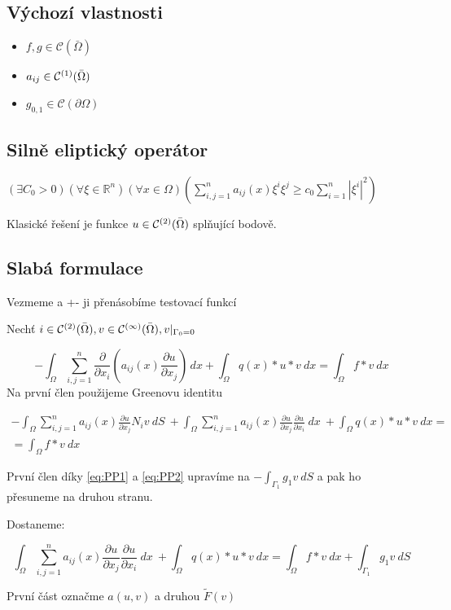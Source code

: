 \documentclass[../main.tex]{subfiles}
\begin{document}
\subsection{Výchozí vlastnosti}
\begin{itemize}
    \item $f, g \in \mathcal{C}(\bar{\Omega})$
    \item $a_{ij} \in \continuous[\bar{\Omega}]{1}$
    \item $g_{0,1} \in \mathcal{C}(\partial\Omega)$
\end{itemize}


\subsection{Silně eliptický operátor}
$(\exists C_0 > 0)(\forall \xi \in \mathbb{R}^n) (\forall x \in \Omega) (\sum_{i,j =1}^{n} a_{ij}(x)\xi^i \xi^j \geq c_0 \sum_{i = 1}^{n}|\xi^i|^2)$


Klasické řešení  je funkce $u\in\continuous[\bar{\Omega}]{2}$ splňující  bodově. 

\subsection{Slabá formulace}\label{SlabaFormulace}
Vezmeme  a +- ji přenásobíme testovací funkcí 

Nechť $i\in \closedcontinuous{2}, v\in\closedcontinuous{\infty}, v|_{\Gamma_0 = 0}$

\begin{equation}
    - \int_\Omega \sum_{i,j = 1}^{n} \frac{\partial}{\partial x_i} \left ( a_{ij}(x) \frac{\partial u}{\partial x_j}\right ) \, dx + \int_\Omega q(x)*u*v \ dx = \int_\Omega f*v \ dx 
\end{equation}
Na první člen použijeme Greenovu identitu

\begin{multline}
    - \int_\Omega \sum_{i,j = 1}^{n}a_{ij}(x) \frac{\partial u }{\partial x_j} N_i v \ dS \
    + \int_\Omega \sum_{i,j = 1}^{n}a_{ij}(x)\frac{\partial u }{\partial x_j}\frac{\partial u }{\partial x_i}\ dx \
    + \int_\Omega q(x)*u*v \ dx =\\= \int_\Omega f*v \ dx 
\end{multline}

První člen díky \eqref{eq:PP1} a \eqref{eq:PP2} upravíme na $- \int_{\Gamma_1} g_1 v \ dS$ a pak ho přesuneme na druhou stranu. 

Dostaneme: 

\begin{equation}
    \int_\Omega \sum_{i,j = 1}^{n}a_{ij}(x)\frac{\partial u }{\partial x_j}\frac{\partial u }{\partial x_i}\ dx \
    + \int_\Omega q(x)*u*v \ dx = \int_\Omega f*v \ dx + \int_{\Gamma_1} g_1 v \ dS
\end{equation}

První část označme $a(u,v)$ a druhou $\tilde{F}(v)$
\end{document}
